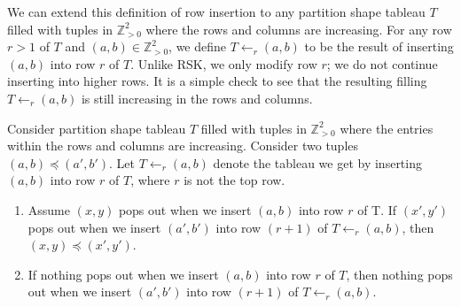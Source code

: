 We can extend this definition of row insertion to any partition shape tableau $T$ filled with tuples in $\mathbb{Z}^2_{>0}$ where the rows and columns are increasing. For any row $r>1$ of $T$ and $(a,b)\in \mathbb{Z}^2_{>0}$, we define $T\leftarrow_{r} (a,b)$ to be the result of inserting $(a,b)$ into row $r$ of $T$. Unlike RSK, we only modify row $r$; we do not continue inserting into higher rows. It is a simple check to see that the resulting filling $T\leftarrow_{r} (a,b)$ is still increasing in the rows and columns.

\begin{lemma}\label{lemma: inserting larger things higher}
    Consider partition shape tableau $T$ filled with tuples in $\mathbb{Z}^2_{>0}$ where the entries within the rows and columns are increasing. Consider two tuples $(a,b) \preceq (a',b')$.
    Let $T\leftarrow_r (a,b)$ denote the tableau we get by inserting $(a,b)$ into row $r$ of $T$, where $r$ is not the top row. 
    \begin{enumerate}
        \item Assume $(x,y)$ pops out when we insert $(a,b)$ into row $r$ of T. If $(x',y')$ pops out when we insert $(a',b')$ into row $(r+1)$ of $T\leftarrow_r (a,b)$, then $(x,y)\preceq (x',y')$.
        \item If nothing pops out when we insert $(a,b)$ into row $r$ of $T$, then nothing pops out when we insert $(a',b')$ into row $(r+1)$ of $T\leftarrow_r (a,b)$.
        \end{enumerate}
\end{lemma}

